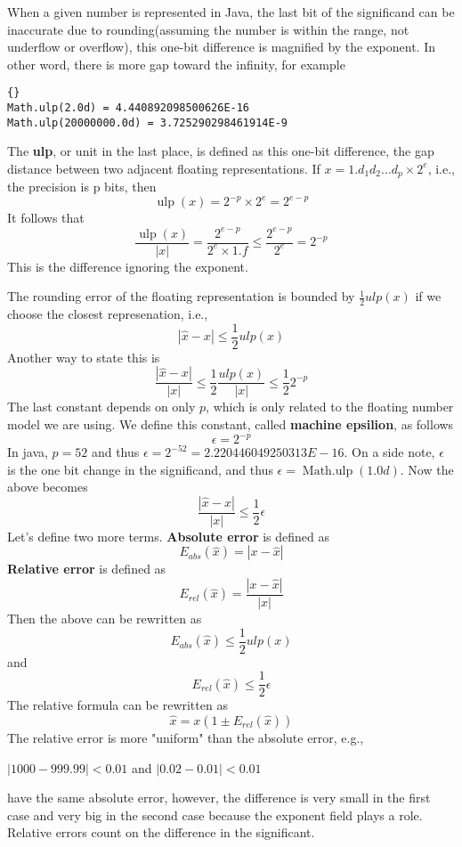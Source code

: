 When a given number is represented in Java, the last bit of the significand can be inaccurate due to rounding(assuming the number is within the range, not underflow or overflow), this one-bit difference is magnified by the exponent. In other word, there is more gap toward the infinity, for example
\begin{lstlisting}[frame=trbl]{}
Math.ulp(2.0d) = 4.440892098500626E-16
Math.ulp(20000000.0d) = 3.725290298461914E-9
\end{lstlisting} 
The \textbf{ulp}, or unit in the last place, is defined as this one-bit difference, the gap distance between two adjacent floating representations. If $x = 1.d_1d_2...d_p \times 2^e$, i.e., the precision is p bits, then \[\operatorname{ulp}(x) = 2^{-p} \times 2^e = 2^{e-p} \]
It follows that
\[ \frac{\operatorname{ulp}(x)}{|x|} = \frac{2^{e-p}}{2^e \times 1.f} \leq \frac{2^{e-p}}{2^e} = 2^{-p}\] 
This is the difference ignoring the exponent.

The rounding error of the floating representation is bounded by $\frac{1}{2}ulp(x)$ if we choose the closest represenation, i.e., 
\[ |\hat{x} - x| \leq \frac{1}{2}ulp(x) \]
Another way to state this is
\[ \frac{|\hat{x} - x|}{|x|} \leq \frac{1}{2}\frac{ulp(x)}{|x|} \leq \frac{1}{2}2^{-p}  \]
The last constant depends on only $p$, which is only related to the floating number model we are using. We define this constant, called \textbf{machine epsilion}, as follows
 \[\epsilon = 2^{-p} \]
In java, $p = 52$ and thus $\epsilon = 2^{-52} = 2.220446049250313E-16$. On a side note, $\epsilon$ is the one bit change in the significand, and thus $\epsilon = \operatorname{Math.ulp}(1.0d)$. Now the above becomes
\[ \frac{|\hat{x} - x|}{|x|} \leq \frac{1}{2}\epsilon\]
Let's define two more terms.
\textbf{Absolute error} is defined as \[E_{abs}(\hat{x}) = |x - \hat{x}|\] 
\textbf{Relative error} is defined as \[E_{rel}(\hat{x}) = \frac{|x - \hat{x}|}{|x|}\]
Then the above can be rewritten as
\[E_{abs}(\hat{x}) \leq \frac{1}{2}ulp(x) \]
and 
 \[E_{rel}(\hat{x})\leq \frac{1}{2}\epsilon\]
The relative formula can be rewritten as \[ \hat{x} = x(1 \pm E_{rel}(\hat{x}))\] 
The relative error is more "uniform" than the absolute error, e.g., 
\begin{center}
$|1000 - 999.99| < 0.01$ and $|0.02 - 0.01| < 0.01$ 
\end{center}
have the same absolute error, however, the difference is very small in the first case and very big in the second case because the exponent field plays a role. Relative errors count on the difference in the significant.

